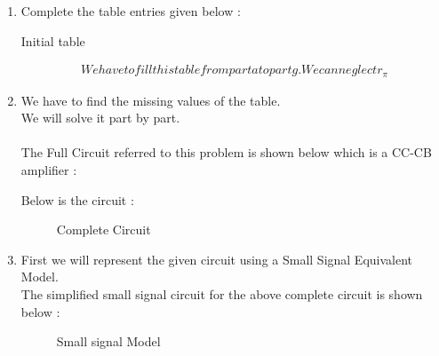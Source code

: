 \begin{enumerate}[label=\thesubsection.\arabic*.,ref=\thesubsection.\theenumi]
\item
Complete the table entries given below :\\


\solution  

\begin{table}[!ht]
\centering

\caption{Initial table}
\label{Table}
\end{table}

\begin{align}

 We have to fill this table from part a to part g. We can neglect r_{\pi}    

\end{align}



\item
We have to find the missing values of the table.\\

\solution
We will solve it part by part.\\


\\

The Full Circuit referred to this problem is shown below which is a CC-CB amplifier : 



Below is the circuit :

\vspace{100cm}

\begin{figure}[!ht]
	\begin{center}
				\resizebox{\columnwidth}{!}{}
	\end{center}
\caption{Complete Circuit }
\label{fig:circuit_1}
\end{figure}


\item

First we will represent the given circuit using a Small Signal Equivalent Model.\\

\solution The simplified small signal circuit for the above complete circuit is shown below :

\begin{figure}[!ht]
	\begin{center}
				\resizebox{\columnwidth}{!}{}
	\end{center}
\caption{Small signal Model }
\label{fig:circuit_1}
\end{figure}



\end{enumerate}
